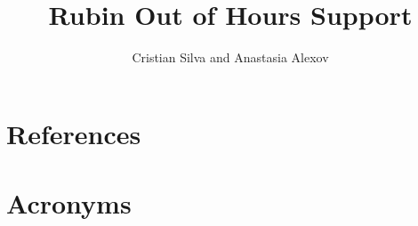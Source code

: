 \documentclass[OPS,lsstdraft,authoryear,toc]{lsstdoc}
\title{Rubin Out of Hours Support}
\author{%
Cristian Silva and Anastasia Alexov
}
\date{\vcsDate}
\begin{document}
\maketitle




\appendix
\section{References} \label{sec:bib}
\renewcommand{\refname}{} %


\section{Acronyms} \label{sec:acronyms}

\end{document}
